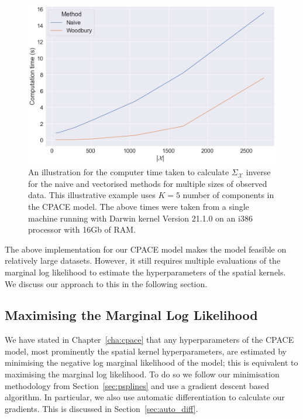 \begin{figure}
	\centering
	\includegraphics[width=\textwidth]{imp_woodbury}
	\caption[An illustration for the computer time taken to calculate $\Sigma_\mathcal{X}$  inverse for the naive and vectorised methods for multiple sizes of observed data.]{An illustration for the computer time taken to calculate $\Sigma_\mathcal{X}$  inverse for the naive and vectorised methods for multiple sizes of observed data. This illustrative example uses $K=5$ number of components in the CPACE model. The above times were taken from a single machine running with Darwin kernel Version 21.1.0 on an i386 processor with 16Gb of RAM.}
	\label{fig:imp_woodbury}
\end{figure}

The above implementation for our CPACE model makes the model feasible on relatively large datasets.
However, it still requires multiple evaluations of the marginal log likelihood to estimate the hyperparameters of the spatial kernels.
We discuss our approach to this in the following section.

\subsection{Maximising the Marginal Log Likelihood \label{ssec:imp_gp_min}}
We have stated in Chapter~\ref{cha:cpace} that any hyperparameters of the CPACE model, most prominently the spatial kernel hyperparameters, are estimated by minimising the negative log marginal likelihood of the model; this is equivalent to maximising the marginal log likelihood.
To do so we follow our minimisation methodology from Section~\ref{sec:psplines} and use a gradient descent based algorithm.
In particular, we also use automatic differentiation to calculate our gradients.
This is discussed in Section~\ref{sec:auto_diff}.

